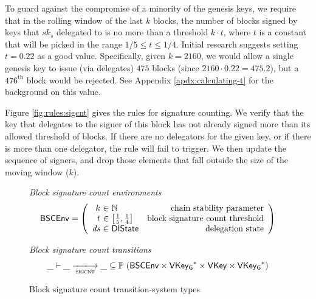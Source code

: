 \documentclass[11pt,a4paper]{article}
\newcommand{\powerset}[1]{\mathbb{P}~#1}
\newcommand{\var}[1]{\mathit{#1}}
\newcommand{\type}[1]{\mathsf{#1}}
\newcommand{\trans}[2]{\xlongrightarrow[\textsc{#1}]{#2}}
\newcommand{\seqof}[1]{#1^{*}}
\newcommand{\VKey}{\type{VKey}}
\newcommand{\VKeyGen}{\type{VKey_G}}
\newcommand{\DelegState}{\type{DIState}}
\begin{document}
\newcommand{\BSCEnv}{\type{BSCEnv}}
\newcommand{\BSCState}{\type{BSCState}}

To guard against the compromise of a minority of the genesis keys,
we require that in the rolling window of the last $k$ blocks, the number of
blocks signed by keys that $sk_s$ delegated to is no more than a threshold $k
\cdot t$, where $t$ is a constant that will be picked in the range
$1/5 \leq t \leq 1/4$. Initial research suggests setting $t=0.22$ as a good
value. Specifically, given $k=2160$, we would allow a single genesis key to
issue (via delegates) $475$ blocks (since $2160 \cdot 0.22 = 475.2$), but a
$476^{\text{th}}$ block would be rejected. See Appendix
\ref{apdx:calculating-t} for the background on this value.

Figure \ref{fig:rules:sigcnt} gives the rules for signature counting. We verify
that the key that delegates to the signer of this block has not already signed
more than its allowed threshold of blocks. If there are no delegators for the
given key, or if there is more than one delegator, the rule will fail to trigger.
%
We then update the sequence of signers, and drop those elements that fall
outside the size of the moving window ($k$).

\begin{figure}[ht]
  \emph{Block signature count environments}
  \begin{equation*}
    \BSCEnv =
    \left(
      \begin{array}{r@{~\in~}lr}
        k & \mathbb{N} & \text{chain stability parameter} \\
        t & \left[\frac{1}{5}, \frac{1}{4}\right] & \text{block signature count threshold}\\
        \var{ds} & \DelegState & \text{delegation state} \\
      \end{array}
    \right)
  \end{equation*}

  \emph{Block signature count transitions}
  \begin{equation*}
    \_ \vdash \var{\_} \trans{sigcnt}{\_} \var{\_} \subseteq
    \powerset (\BSCEnv \times \seqof{\VKeyGen} \times \VKey \times \seqof{\VKeyGen})
  \end{equation*}
  \caption{Block signature count transition-system types}
  \label{fig:ts-types:sigcnt}
\end{figure}
\end{document}
